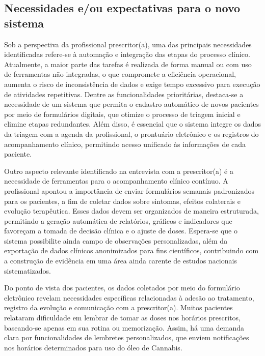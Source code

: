 \href{}{}\documentclass[12pt,portuguese,oneside]{article}
\begin{document}
\subsection{Necessidades e/ou expectativas para o novo sistema}

\hspace{1em} Sob a perspectiva da profissional prescritor(a), uma das principais necessidades identificadas refere-se à automação e integração das etapas do processo clínico. Atualmente, a maior parte das tarefas é realizada de forma manual ou com uso de ferramentas não integradas, o que compromete a eficiência operacional, aumenta o risco de inconsistência de dados e exige tempo excessivo para execução de atividades repetitivas. Dentre as funcionalidades prioritárias, destaca-se a necessidade de um sistema que permita o cadastro automático de novos pacientes por meio de formulários digitais, que otimize o processo de triagem inicial e elimine etapas redundantes. Além disso, é essencial que o sistema integre os dados da triagem com a agenda da profissional, o prontuário eletrônico e os registros do acompanhamento clínico, permitindo acesso unificado às informações de cada paciente.

Outro aspecto relevante identificado na entrevista com a prescritor(a) é a necessidade de ferramentas para o acompanhamento clínico contínuo. A profissional apontou a importância de enviar formulários semanais padronizados para os pacientes, a fim de coletar dados sobre sintomas, efeitos colaterais e evolução terapêutica. Esses dados devem ser organizados de maneira estruturada, permitindo a geração automática de relatórios, gráficos e indicadores que favoreçam a tomada de decisão clínica e o ajuste de doses. Espera-se que o sistema possibilite ainda  campo de observações personalizadas, além da exportação de dados clínicos anonimizados para fins científicos, contribuindo com a construção de evidência em uma área ainda carente de estudos nacionais sistematizados.

Do ponto de vista dos pacientes, os dados coletados por meio do formulário eletrônico revelam necessidades específicas relacionadas à adesão ao tratamento, registro da evolução e comunicação com a prescritor(a). Muitos pacientes relataram dificuldade em lembrar de tomar as doses nos horários prescritos, baseando-se apenas em sua rotina ou memorização. Assim, há uma demanda clara por funcionalidades de lembretes personalizados, que enviem notificações nos horários determinados para uso do óleo de Cannabis.
\end{document}
